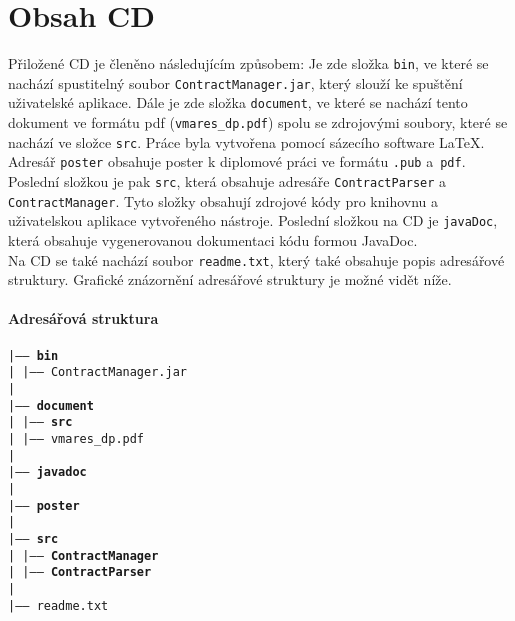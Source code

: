\chapter{Obsah CD}
	Přiložené CD je členěno následujícím způsobem: Je zde složka \texttt{bin}, ve které se nachází spustitelný soubor \texttt{ContractManager.jar}, který slouží ke spuštění uživatelské aplikace. Dále je zde složka \texttt{document}, ve které se nachází tento dokument ve formátu pdf (\texttt{vmares\_dp.pdf}) spolu se zdrojovými soubory, které se nachází ve složce \texttt{src}. Práce byla vytvořena pomocí sázecího software LaTeX.\\
	
	Adresář \texttt{poster} obsahuje poster k diplomové práci ve formátu \texttt{.pub} a~\texttt{pdf}. Poslední složkou je pak \texttt{src}, která obsahuje adresáře \texttt{ContractParser} a \texttt{ContractManager}. Tyto složky obsahují zdrojové kódy pro knihovnu a uživatelskou aplikace vytvořeného nástroje. Poslední složkou na CD je \texttt{javaDoc}, která obsahuje vygenerovanou dokumentaci kódu formou JavaDoc.\\
	
	Na CD se také nachází soubor \texttt{readme.txt}, který také obsahuje popis adresářové struktury. Grafické znázornění adresářové struktury je možné vidět níže.

	\subsubsection{Adresářová struktura}
	\noindent
	\texttt{|----- \textbf{bin}}\\
	\texttt{|\- \- \- \- |----- ContractManager.jar}\\
	\texttt{|}\\
	\texttt{|----- \textbf{document}}\\
	\texttt{|\- \- \- \- |----- \textbf{src}}\\
	\texttt{|\- \- \- \- |----- vmares\_dp.pdf}\\
	\texttt{|}\\
	\texttt{|----- \textbf{javadoc}}\\
	\texttt{|}\\
	\texttt{|----- \textbf{poster}}\\
	\texttt{|}\\
	\texttt{|----- \textbf{src}}\\
	\texttt{|\- \- \- \- |----- \textbf{ContractManager}}\\
	\texttt{|\- \- \- \- |----- \textbf{ContractParser}}\\
	\texttt{|}\\
	\texttt{|----- readme.txt}\\